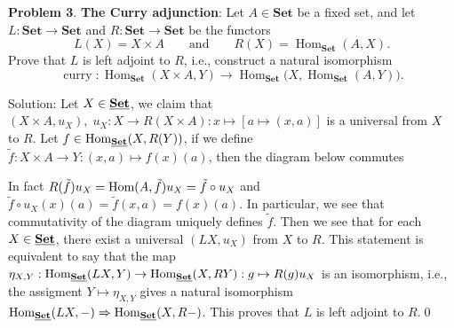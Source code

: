 \begin{dang}
    \textbf{Problem 3}.
    \textbf{The Curry adjunction}:
Let $A \in \mathbf{Set}$ be a fixed set, and let
$L : \mathbf{Set} \to \mathbf{Set}$ and
$R : \mathbf{Set} \to \mathbf{Set}$ be the functors
\[
L(X) = X \times A
\qquad\text{and}\qquad
R(X) = \operatorname{Hom}_{\mathbf{Set}}(A,X).
\]
Prove that $L$ is left adjoint to $R$, i.e., construct a natural
isomorphism
\[
\operatorname{curry} :
\operatorname{Hom}_{\mathbf{Set}}(X \times A,Y)
\longrightarrow
\operatorname{Hom}_{\mathbf{Set}}
\bigl(X,\operatorname{Hom}_{\mathbf{Set}}(A,Y)\bigr).
\]
\end{dang}
Solution: Let $X\in\underline{\textbf{Set}}$, we claim that $(X\times A, u_X),\;u_X:X\to R(X\times A):x\mapsto [a\mapsto (x,a)]$ is a universal 
from $X$ to $R$. Let $f\in\text{Hom}_{\underline{\textbf{Set}}}(X,R(Y))$, if we define $\tilde{f}:X\times A\to Y:(x,a)\mapsto f(x)(a)$, then 
the diagram below commutes 
\begin{center}
\end{center}
In fact $R(\tilde{f})u_X=\text{Hom}(A,\tilde{f})u_X=\tilde{f}\circ u_X$ and 
$\tilde{f}\circ u_X(x)(a)=\tilde{f}(x,a)=f(x)(a)$. In particular, we see that commutativity of the diagram 
uniquely defines $\tilde{f}$. Then we see that for each $X\in\underline{\textbf{Set}}$, there exist 
a universal $(LX, u_X)$ from $X$ to $R$. This statement is equivalent to say that the 
map $\eta_{X,Y}:\text{Hom}_{\underline{\textbf{Set}}}(LX,Y)\rightarrow \text{Hom}_{\underline{\textbf{Set}}}(X,RY): g\mapsto R(g)u_X$ is an isomorphism, i.e., 
the assigment $Y\mapsto \eta_{X,Y}$ gives a natural isomorphism 
$\text{Hom}_{\underline{\textbf{Set}}}(LX,-)\Rightarrow \text{Hom}_{\underline{\textbf{Set}}}(X,R-)$. This proves that $L$ is left adjoint to $R$.\qed



